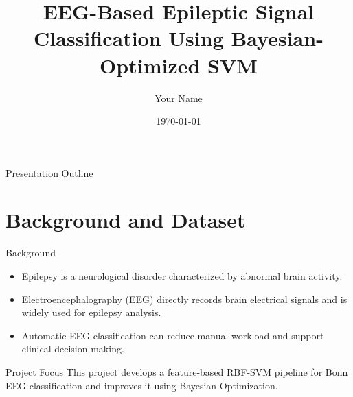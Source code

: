 \documentclass[10pt,aspectratio=169]{beamer}
\title[EEG Classification]{EEG-Based Epileptic Signal Classification Using Bayesian-Optimized SVM}
\author{Your Name}
\institute{Final Year Project}
\date{\today}
\begin{document}
\begin{frame}
  \titlepage
\end{frame}

\begin{frame}{Presentation Outline}
  \tableofcontents
\end{frame}

\section{Background and Dataset}

\begin{frame}{Background}
  \begin{itemize}
    \item Epilepsy is a neurological disorder characterized by abnormal brain activity.
    \item Electroencephalography (EEG) directly records brain electrical signals and is widely used for epilepsy analysis.
    \item Automatic EEG classification can reduce manual workload and support clinical decision-making.
  \end{itemize}

  \begin{block}{Project Focus}
    This project develops a feature-based RBF-SVM pipeline for Bonn EEG classification and improves it using Bayesian Optimization.
  \end{block}
\end{frame}
\end{document}
